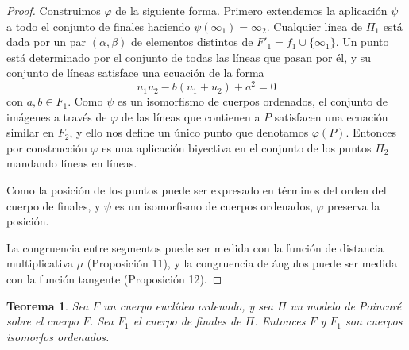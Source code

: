 \documentclass[a4paper]{amsart}
\theoremstyle{plain}
\newtheorem{theorem}{Teorema}
\begin{document}
\begin{proof}
Construimos $\varphi$ de la siguiente forma. Primero extendemos la aplicación $\psi$ a todo el conjunto de finales haciendo $\psi(\infty_1)=\infty_2$. Cualquier línea de $\Pi_1$ está dada por un par $(\alpha,\beta)$ de elementos distintos de $F'_1=f_1\cup\{\infty_1\}$. Un punto está determinado por el conjunto de todas las líneas que pasan por él, y su conjunto de líneas satisface una ecuación de la forma
\[
u_1u_2-b(u_1+u_2)+a^2=0
\]
con $a,b\in F_1$. Como $\psi$ es un isomorfismo de cuerpos ordenados, el conjunto de imágenes a través de $\varphi$ de las líneas que contienen a $P$ satisfacen una ecuación similar en $F_2$, y ello nos define un único punto que denotamos $\varphi(P)$. Entonces por construcción $\varphi$  es una aplicación biyectiva en el conjunto de los puntos $\Pi_2$ mandando líneas en líneas.

Como la posición de los puntos puede ser expresado en términos del orden del cuerpo de finales, y $\psi$ es un isomorfismo de cuerpos ordenados, $\varphi$ preserva la posición.

La congruencia entre segmentos puede ser medida con la función de distancia multiplicativa $\mu$ (Proposición 11), y la congruencia de ángulos puede ser medida con la función tangente (Proposición 12).
\end{proof}

\begin{theorem}
Sea $F$ un cuerpo euclídeo ordenado, y sea $\Pi$ un modelo de Poincaré sobre el cuerpo $F$. Sea $F_1$ el cuerpo de finales de $\Pi$. Entonces $F$ y $F_1$ son cuerpos isomorfos ordenados.
\end{theorem}
\end{document}
